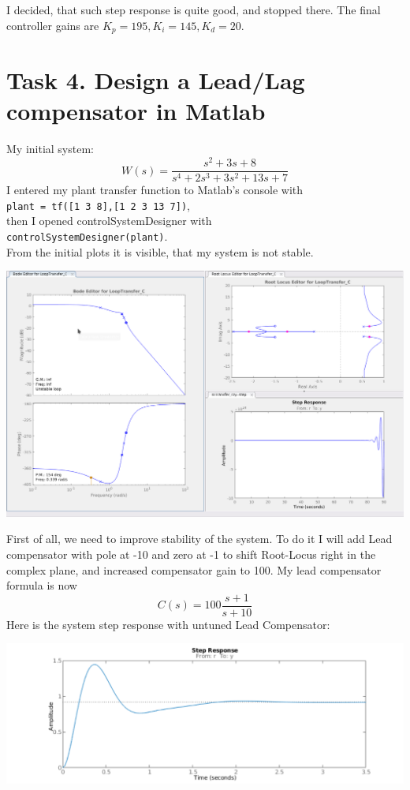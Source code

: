 \documentclass[a4paper,12pt]{article}
\begin{document}
    I decided, that such step response is quite good, and stopped there. The final 
    controller gains are $K_p = 195, K_i = 145, K_d = 20$.
\section{Task 4. Design a Lead/Lag compensator in Matlab}
    My initial system:
    \begin{equation*}
        W(s) = \frac{s^2+3s+8}{s^4+2s^3+3s^2+13s+7}
    \end{equation*}
    I entered my plant transfer function to Matlab's console with\\
    \texttt{plant = tf([1 3 8],[1 2 3 13 7])},\\
    then I opened controlSystemDesigner with \\
    \texttt{controlSystemDesigner(plant)}.\\
    From the initial plots it is visible, that my system is not stable. 
    \begin{center}
        \includegraphics[width=\linewidth]{../Task4/Init.png}
    \end{center}
    First of all, we need to improve stability of the system. To do it I will add
    Lead compensator with pole at -10 and zero at -1 to shift Root-Locus right 
    in the complex plane, and increased compensator gain to 100. My lead compensator
    formula is now
    \begin{equation*}
        C(s) = 100 \frac{s+1}{s+10}
    \end{equation*}
    Here is the system step response with untuned Lead Compensator:
    \begin{center}
        \includegraphics[width=\linewidth]{../Task4/Lead.pdf}
    \end{center}
\end{document}
